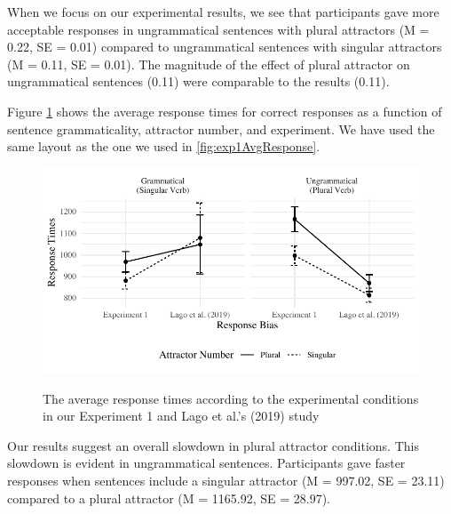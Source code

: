 When we focus on our experimental results, we see that participants gave more acceptable responses in ungrammatical sentences with plural attractors (M = 0.22, SE = 0.01) compared to ungrammatical sentences with singular attractors (M = 0.11, SE = 0.01). The magnitude of the effect of plural attractor on ungrammatical sentences (0.11) were comparable to the \cites{LagoEtAl2019} results (0.11).

Figure \ref{fig:exp1RT} shows the average response times for correct responses as a function of sentence grammaticality, attractor number, and experiment. We have used the same layout as the one we used in \ref{fig:exp1AvgResponse}.





\begin{figure}[hbt!]
{\centering \includegraphics[width=\linewidth]{figure/exp1RT-1} 
}

\caption{The average response times according to the experimental conditions in our Experiment 1 and Lago et al.'s (2019) study}\label{fig:exp1RT}
\end{figure}


Our results suggest an overall slowdown in plural attractor conditions. This slowdown is evident in ungrammatical sentences. Participants gave faster responses when sentences include a singular attractor (M = 997.02, SE = 23.11) compared to a plural attractor (M = 1165.92, SE = 28.97). 


